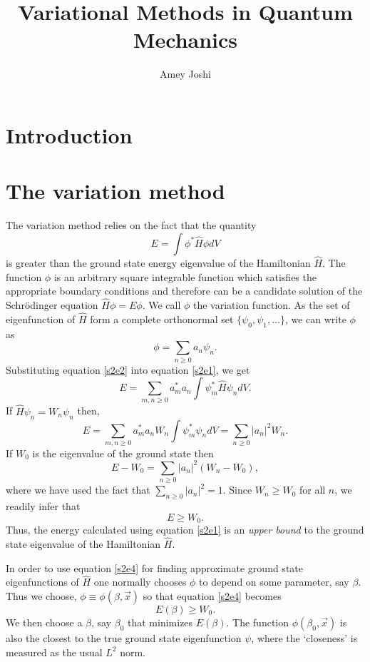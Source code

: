 \documentclass{article}
\numberwithin{equation}{section}
\begin{document}
\title{Variational Methods in Quantum Mechanics}
\author{Amey Joshi}
\maketitle
\section{Introduction}\label{s1}
\section{The variation method}\label{s2}
The variation method relies on the fact that the quantity
\begin{equation}\label{s2e1}
E = \int\phi^\ast\hat{H}\phi dV
\end{equation}
is greater than the ground state energy eigenvalue of the Hamiltonian $\hat{H}$. 
The function $\phi$ is an arbitrary square integrable function which satisfies
the appropriate boundary conditions and therefore can be a candidate solution
of the Schr\"{o}dinger equation $\hat{H}\phi = E\phi$. We call $\phi$ the
variation function. As the set of eigenfunction of $\hat{H}$ form a complete
orthonormal set $\{\psi_0, \psi_1, \ldots\}$, we can write $\phi$ as
\begin{equation}\label{s2e2}
\phi = \sum_{n \ge 0}a_n\psi_n.
\end{equation}
Substituting equation \eqref{s2e2} into equation \eqref{s2e1}, we get
\[
E = \sum_{m,n \ge 0}a_m^\ast a_n \int \psi_m^\ast \hat{H}\psi_n dV.
\]
If $\hat{H}\psi_n = W_n\psi_n$ then,
\[
E = \sum_{m,n \ge 0}a_m^\ast a_n W_n \int\psi_m^\ast\psi_n dV = \sum_{n \ge 0}|a_n|^2W_n.
\]
If $W_0$ is the eigenvalue of the ground state then
\begin{equation}\label{s2e3}
E - W_0 = \sum_{n \ge 0}|a_n|^2(W_n - W_0),
\end{equation}
where we have used the fact that $\sum_{n \ge 0}|a_n|^2 = 1$. Since $W_n \ge W_0$
for all $n$, we readily infer that
\begin{equation}\label{s2e4}
E \ge W_0.
\end{equation}
Thus, the energy calculated using equation \eqref{s2e1} is an \emph{upper bound}
to the ground state eigenvalue of the Hamiltonian $\hat{H}$. 

In order to use equation \eqref{s2e4} for finding approximate ground state
eigenfunctions of $\hat{H}$ one normally chooses $\phi$ to depend on some 
parameter, say $\beta$. Thus we choose, $\phi \equiv \phi(\beta, \vec{x})$
so that equation \eqref{s2e4} becomes
\begin{equation}\label{s2e5}
E(\beta) \ge W_0.
\end{equation}
We then choose a $\beta$, say $\beta_0$ that minimizes $E(\beta)$. The function
$\phi(\beta_0, \vec{x})$ is also the closest to the true ground state 
eigenfunction $\psi$, where the `closeness' is measured as the usual $L^2$ norm.
\end{document}

